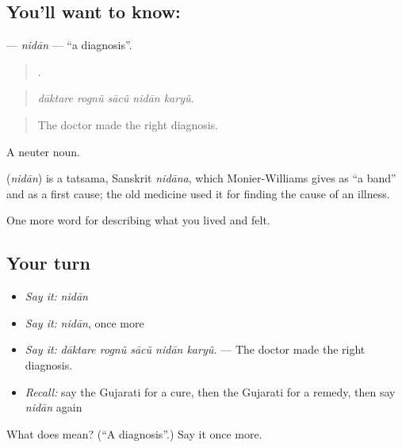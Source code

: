 \subsection*{You'll want to know: }
\textbf{} — \emph{nidān} — \textquotedblleft{}a diagnosis\textquotedblright{}.

\begin{quote}
    .
\end{quote}

\begin{quote}
\emph{dāktare rognũ sācũ nidān karyũ.}
\end{quote}

\begin{quote}
The doctor made the right diagnosis.
\end{quote}

A neuter noun.

\begin{cousinweb}
\textbf{} (\emph{nidān}) is a tatsama, Sanskrit \emph{nidāna}, which Monier-Williams gives as \textquotedblleft{}a band\textquotedblright{} and as a first cause; the old medicine used it for finding the cause of an illness.
\end{cousinweb}

\begin{grammarlens}[title={What you've built}]
One more word for describing what you lived and felt.
\end{grammarlens}

\subsection*{Your turn}
\begin{itemize}
\raggedright
  \item \emph{Say it:} \emph{nidān}
  \item \emph{Say it:} \emph{nidān}, once more
  \item \emph{Say it:} \emph{dāktare rognũ sācũ nidān karyũ.} — The doctor made the right diagnosis.
  \item \emph{Recall:} say the Gujarati for a cure, then the Gujarati for a remedy, then say \emph{nidān} again
\end{itemize}

\begin{tcolorbox}[breakable,colback=teal!4,colframe=teal!35!black,title={Before you move on}]
What does  mean? (\textquotedblleft{}A diagnosis\textquotedblright{}.) Say it once more.
\end{tcolorbox}
